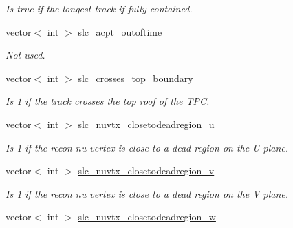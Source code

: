\begin{DoxyCompactItemize}
\begin{DoxyCompactList}\small\item\em Is true if the longest track if fully contained. \end{DoxyCompactList}\item 
\hypertarget{classUBXSecEvent_afd52675b8ca60af2941105f9739909a4}{vector$<$ int $>$ \hyperlink{classUBXSecEvent_afd52675b8ca60af2941105f9739909a4}{slc\-\_\-acpt\-\_\-outoftime}}\label{classUBXSecEvent_afd52675b8ca60af2941105f9739909a4}

\begin{DoxyCompactList}\small\item\em Not used. \end{DoxyCompactList}\item 
\hypertarget{classUBXSecEvent_ae7aee5c97b811d2e867cab5ec4fa1ffd}{vector$<$ int $>$ \hyperlink{classUBXSecEvent_ae7aee5c97b811d2e867cab5ec4fa1ffd}{slc\-\_\-crosses\-\_\-top\-\_\-boundary}}\label{classUBXSecEvent_ae7aee5c97b811d2e867cab5ec4fa1ffd}

\begin{DoxyCompactList}\small\item\em Is 1 if the track crosses the top roof of the T\-P\-C. \end{DoxyCompactList}\item 
\hypertarget{classUBXSecEvent_a702fda60b130a5de87b4cd5639b111d6}{vector$<$ int $>$ \hyperlink{classUBXSecEvent_a702fda60b130a5de87b4cd5639b111d6}{slc\-\_\-nuvtx\-\_\-closetodeadregion\-\_\-u}}\label{classUBXSecEvent_a702fda60b130a5de87b4cd5639b111d6}

\begin{DoxyCompactList}\small\item\em Is 1 if the recon nu vertex is close to a dead region on the U plane. \end{DoxyCompactList}\item 
\hypertarget{classUBXSecEvent_aea1570a2a53f22dcbbe2d0c349502a3b}{vector$<$ int $>$ \hyperlink{classUBXSecEvent_aea1570a2a53f22dcbbe2d0c349502a3b}{slc\-\_\-nuvtx\-\_\-closetodeadregion\-\_\-v}}\label{classUBXSecEvent_aea1570a2a53f22dcbbe2d0c349502a3b}

\begin{DoxyCompactList}\small\item\em Is 1 if the recon nu vertex is close to a dead region on the V plane. \end{DoxyCompactList}\item 
\hypertarget{classUBXSecEvent_a0e32deb7f9e8d3f4356b52dfa74892ad}{vector$<$ int $>$ \hyperlink{classUBXSecEvent_a0e32deb7f9e8d3f4356b52dfa74892ad}{slc\-\_\-nuvtx\-\_\-closetodeadregion\-\_\-w}}\label{classUBXSecEvent_a0e32deb7f9e8d3f4356b52dfa74892ad}


\end{DoxyCompactItemize}
